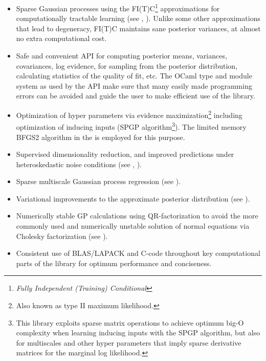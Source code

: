 \documentclass[10pt]{report}
\begin{document}
\begin{itemize}

\item Sparse Gaussian processes using the FI(T)C\footnote{\emph{Fully
Independent (Training) Conditional}} approximations for computationally
tractable learning (see \cite{conf/nips/2005}, \cite{SnelsonThesis}).  Unlike
some other approximations that lead to degeneracy, FI(T)C maintains sane
posterior variances, at almost no extra computational cost.

\item Safe and convenient API for computing posterior means, variances,
covariances, log evidence, for sampling from the posterior distribution,
calculating statistics of the quality of fit, etc.  The OCaml type and module
system as used by the API make sure that many easily made programming errors can
be avoided and guide the user to make efficient use of the library.

\item Optimization of hyper parameters via evidence maximization\footnote{Also
known as type II maximum likelihood.} including optimization of inducing inputs
(SPGP algorithm\footnote{This library exploits sparse matrix operations to
achieve optimum big-O complexity when learning inducing inputs with the SPGP
algorithm, but also for multiscales and other hyper parameters that imply sparse
derivative matrices for the marginal log likelihood.}).  The limited memory
BFGS2 algorithm in the  is employed for this purpose.

\item Supervised dimensionality reduction, and improved predictions under
heteroskedastic noise conditions (see \cite{conf/uai/SnelsonG06},
\cite{SnelsonThesis}).

\item Sparse multiscale Gaussian process regression (see
\cite{conf/icml/WalderKS08}).

\item Variational improvements to the approximate posterior distribution (see
\cite{Titsias2009}).

\item Numerically stable GP calculations using QR-factorization to avoid the
more commonly used and numerically unstable solution of normal equations via
Cholesky factorization (see \cite{Foster2009}).

\item Consistent use of BLAS/LAPACK and C-code throughout key computational
parts of the library for optimum performance and conciseness.


\end{itemize}
\end{document}
